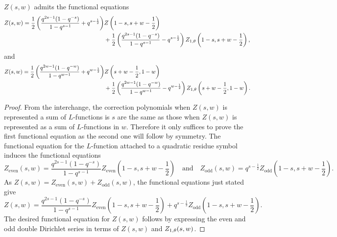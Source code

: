 \documentclass[12pt,reqno,oneside]{amsart}
\begin{document}
    \begin{theorem}\label{thm:double_Dirichlet_series_functional_equation}
        $Z(s,w)$ admits the functional equations
        \begin{align*}
            Z(s,w) = \frac{1}{2}\left(\frac{q^{2s-1}(1-q^{-s})}{1-q^{s-1}}+q^{s-\frac{1}{2}}\right)&Z\left(1-s,s+w-\frac{1}{2}\right) \\
            &+\frac{1}{2}\left(\frac{q^{2s-1}(1-q^{-s})}{1-q^{s-1}}-q^{s-\frac{1}{2}}\right)Z_{1,\theta}\left(1-s,s+w-\frac{1}{2}\right),
        \end{align*}
        and
        \begin{align*}
            Z(s,w) = \frac{1}{2}\left(\frac{q^{2w-1}(1-q^{-w})}{1-q^{w-1}}+q^{w-\frac{1}{2}}\right)&Z\left(s+w-\frac{1}{2},1-w\right) \\
            &+\frac{1}{2}\left(\frac{q^{2w-1}(1-q^{-w})}{1-q^{w-1}}-q^{w-\frac{1}{2}}\right)Z_{1,\theta}\left(s+w-\frac{1}{2},1-w\right).
        \end{align*}
    \end{theorem}
    \begin{proof}
        From the interchange, the correction polynomials when $Z(s,w)$ is represented a sum of $L$-functions is $s$ are the same as those when $Z(s,w)$ is represented as a sum of $L$-functions in $w$. Therefore it only suffices to prove the first functional equation as the second one will follow by symmetry. The functional equation for the $L$-function attached to a quadratic residue symbol induces the functional equations
        \[
            Z_{\text{even}}(s,w) = \frac{q^{2s-1}(1-q^{-s})}{1-q^{s-1}}Z_{\text{even}}\left(1-s,s+w-\frac{1}{2}\right) \quad \text{and} \quad Z_{\text{odd}}(s,w) = q^{s-\frac{1}{2}}Z_{\text{odd}}\left(1-s,s+w-\frac{1}{2}\right).
        \]
        As $Z(s,w) = Z_{\text{even}}(s,w)+Z_{\text{odd}}(s,w)$, the functional equations just stated give
        \[
            Z(s,w) = \frac{q^{2s-1}(1-q^{-s})}{1-q^{s-1}}Z_{\text{even}}\left(1-s,s+w-\frac{1}{2}\right)+q^{s-\frac{1}{2}}Z_{\text{odd}}\left(1-s,s+w-\frac{1}{2}\right).
        \]
        The desired functional equation for $Z(s,w)$ follows by expressing the even and odd double Dirichlet series in terms of $Z(s,w)$ and $Z_{1,\theta}(s,w)$.
    \end{proof}
\end{document}
